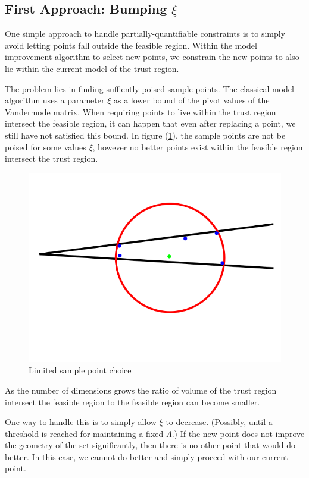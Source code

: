 \documentclass{article}
\theoremstyle{case}
\let\oldref\ref
\renewcommand{\ref}[1]{(\oldref{#1})}
\begin{document}
\subsection{First Approach: Bumping $\xi$}
One simple approach to handle partially-quantifiable constraints is to simply avoid letting points fall outside the feasible region.
Within the model improvement algorithm to select new points, we constrain the new points to also lie within the current model of the trust region.

The problem lies in finding suffiently poised sample points.
The classical model algorithm uses a parameter $\xi$ as a lower bound of the pivot values of the Vandermode matrix.
When requiring points to live within the trust region intersect the feasible region, it can happen that even after replacing a point, we still have not satisfied this bound.
In figure \ref{lspc}, the sample points are not be poised for some values $\xi$, however no better points exist within the feasible region intersect the trust region.

\begin{figure}[h]
    \centering
    \includegraphics[scale=0.4]{images/bad_lambda.png}
    \caption{Limited sample point choice}
    \label{lspc}
\end{figure}

As the number of dimensions grows the ratio of volume of the trust region intersect the feasible region to the feasible region can become smaller.

One way to handle this is to simply allow $\xi$ to decrease. (Possibly, until a threshold is reached for maintaining a fixed $\Lambda$.)
If the new point does not improve the geometry of the set significantly, then there is no other point that would do better.
In this case, we cannot do better and simply proceed with our current point.
\end{document}
